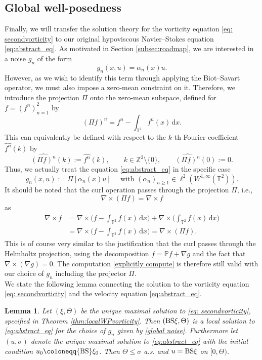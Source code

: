 \documentclass[11pt, a4paper,oneside, reqno]{amsart}
\newtheorem{lemma}[theorem]{Lemma}
\theoremstyle{remark} %
\theoremstyle{definition} %
\numberwithin{theorem}{section}
\numberwithin{equation}{section}
\renewcommand{\P}{{\mathbb P}}
\newcommand{\BS}{{\rm BS}}
\newcommand{\T}{\mathbb{T}}
\newcommand{\dd}{\hspace{2pt}\mathrm{d}}
\begin{document}
\subsection{Global well-posedness}\label{subsec:proofglobal}
Finally, we will transfer the solution theory for the vorticity equation \eqref{eq: secondvorticity} to our original hypoviscous Navier--Stokes equation \eqref{eq:abstract_eq}. As motivated in Section \ref{subsec:roadmap}, we are interested in a noise $g_n$ of the form
$$g_n(x,u) = \alpha_n(x)u.$$
However, as we wish to identify this term through applying the Biot--Savart operator, we must also impose a zero-mean constraint on it. Therefore, we introduce the projection $\Pi$ onto the zero-mean subspace, defined for $f=(f^n)_{n=1}^2$ by
$$(\Pi f)^n = f^n - \int_{\T^2}f^n(x)\dd x.$$
This can equivalently be defined with respect to the $k$-th Fourier coefficient $\widehat{f^n}(k)$ by
\begin{equation*}
\widehat{(\Pi f)^n}(k)
:=
\widehat{f^n}(k),
\qquad
k\in\mathbb{Z}^2\setminus\{0\},
\qquad
\widehat{(\Pi f)^n}(0)
:=
0.
\end{equation*}
Thus, we actually treat the equation \eqref{eq:abstract_eq} in the specific case
\begin{equation} \label{global noise}g_n(x,u):= \Pi[\alpha_n(x)u]\quad \text{ with }(\alpha_n)_{n\geq 1}\in \ell^2(W^{1,\infty}(\T^2)).\end{equation}
It should be noted that the curl operation passes through the projection $\Pi$, i.e.,
$$\nabla \times (\Pi f) = \nabla \times f$$
as
\begin{align*}
    \nabla \times f &= \nabla \times \Big(f - \int_{\T^2}f(x)\dd x \Big) + \nabla \times  \Big(\int_{\T^2}f(x)\dd x\Big)\\& = \nabla \times \Big(f - \int_{\T^2}f(x)\dd x \Big) = \nabla \times \left(\Pi f \right).
\end{align*}
This is of course very similar to the justification that the curl passes through the Helmholtz projection, using the decomposition $f = \P f + \nabla g$ and the fact that $\nabla \times (\nabla g) = 0$. The computation \eqref{explicitly compute} is therefore still valid with our choice of $g_n$ including the projector $\Pi$.\\

We state the following lemma connecting the solution to the vorticity equation \eqref{eq: secondvorticity} and the velocity equation \eqref{eq:abstract_eq}.

\begin{lemma} \label{lemma:vorticity_to_velocity}
    Let $(\xi,\Theta)$ be the unique maximal solution to \eqref{eq: secondvorticity}, specified in Theorem \ref{thm:localWPvorticity}. Then $(\BS\xi, \Theta)$ is a local solution to \eqref{eq:abstract_eq} for the choice of $g_n$ given by \eqref{global noise}. Furthermore let $(u,\sigma)$ denote the unique maximal solution to \eqref{eq:abstract_eq} with the initial condition $u_0 \coloneqq \BS\xi_0$. Then $\Theta \leq \sigma$ a.s. and $u = \BS\xi$ on $[0,\Theta)$. 
\end{lemma}
\end{document}
